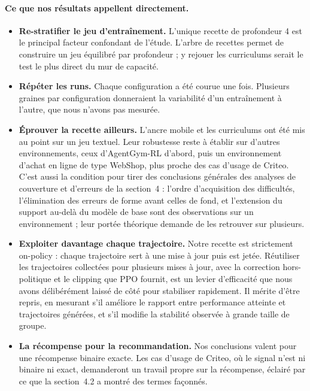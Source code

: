 \documentclass[11pt,a4paper]{article}
\begin{document}
\paragraph{Ce que nos résultats appellent directement.}
\begin{itemize}
    \item \textbf{Re-stratifier le jeu d'entraînement.} L'unique recette de profondeur 4 est le principal facteur confondant de l'étude. L'arbre de recettes permet de construire un jeu équilibré par profondeur ; y rejouer les curriculums serait le test le plus direct du mur de capacité.
    \item \textbf{Répéter les runs.} Chaque configuration a été courue une fois. Plusieurs graines par configuration donneraient la variabilité d'un entraînement à l'autre, que nous n'avons pas mesurée.
    \item \textbf{Éprouver la recette ailleurs.} L'ancre mobile et les curriculums ont été mis au point sur un jeu textuel. Leur robustesse reste à établir sur d'autres environnements, ceux d'AgentGym-RL d'abord, puis un environnement d'achat en ligne de type WebShop, plus proche des cas d'usage de Criteo. C'est aussi la condition pour tirer des conclusions générales des analyses de couverture et d'erreurs de la section~4 : l'ordre d'acquisition des difficultés, l'élimination des erreurs de forme avant celles de fond, et l'extension du support au-delà du modèle de base sont des observations sur un environnement ; leur portée théorique demande de les retrouver sur plusieurs.
    \item \textbf{Exploiter davantage chaque trajectoire.} Notre recette est strictement on-policy : chaque trajectoire sert à une mise à jour puis est jetée. Réutiliser les trajectoires collectées pour plusieurs mises à jour, avec la correction hors-politique et le clipping que PPO fournit, est un levier d'efficacité que nous avons délibérément laissé de côté pour stabiliser rapidement. Il mérite d'être repris, en mesurant s'il améliore le rapport entre performance atteinte et trajectoires générées, et s'il modifie la stabilité observée à grande taille de groupe.
    \item \textbf{La récompense pour la recommandation.} Nos conclusions valent pour une récompense binaire exacte. Les cas d'usage de Criteo, où le signal n'est ni binaire ni exact, demanderont un travail propre sur la récompense, éclairé par ce que la section~4.2 a montré des termes façonnés.
\end{itemize}
\end{document}
